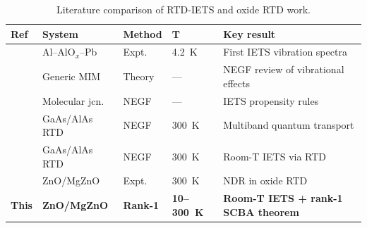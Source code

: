\documentclass[conference]{IEEEtran}
\begin{document}




\begin{table}[t]
\caption{Literature comparison of RTD-IETS and oxide RTD work.}
\label{tab:lit}
\centering
\footnotesize
\begin{tabular}{@{}llllp{3.2cm}@{}}
\toprule
Ref & System & Method & T & Key result \\
\midrule
\cite{jaklevic1966} & Al--AlO$_x$--Pb & Expt. & 4.2~K & First IETS vibration spectra \\
\cite{galperin2007} & Generic MIM & Theory & --- & NEGF review of vibrational effects \\
\cite{troisi2006} & Molecular jcn. & NEGF & --- & IETS propensity rules \\
\cite{lake1997} & GaAs/AlAs RTD & NEGF & 300~K & Multiband quantum transport \\
\cite{patil2018} & GaAs/AlAs RTD & NEGF & 300~K & Room-T IETS via RTD \\
\cite{tampo2019} & ZnO/MgZnO & Expt. & 300~K & NDR in oxide RTD \\
\textbf{This} & \textbf{ZnO/MgZnO} & \textbf{Rank-1} & \textbf{10--300~K} & \textbf{Room-T IETS + rank-1 SCBA theorem} \\
\bottomrule
\end{tabular}
\end{table}
\end{document}
